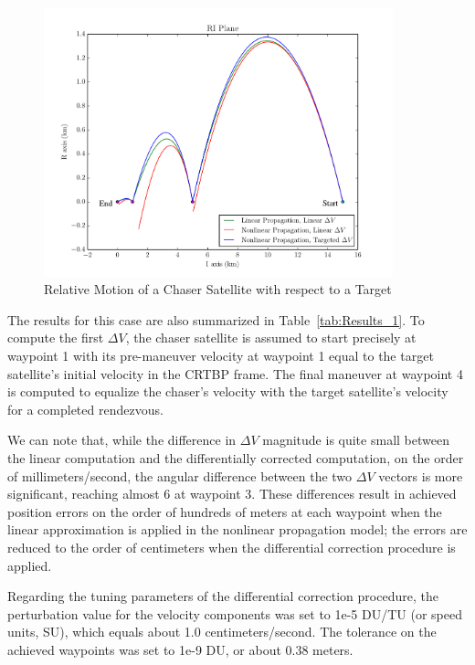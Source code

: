 \documentclass[letterpaper, preprint, paper,11pt]{AAS}	%
\begin{document}
\begin{figure}[htb] 
	\begin{center}
		\includegraphics[width=0.9\textwidth]{RIC_1}
		\caption{Relative Motion of a Chaser Satellite with respect to a Target}
		\label{fig:RIC_1}
	\end{center}
\end{figure} %

The results for this case are also summarized in Table~\ref{tab:Results_1}.  To compute the first \(\Delta V\), the chaser satellite is assumed to start precisely at waypoint 1 with its pre-maneuver velocity at waypoint 1 equal to the target satellite's initial velocity in the CRTBP frame.  The final maneuver at waypoint 4 is computed to equalize the chaser's velocity with the target satellite's velocity for a completed rendezvous.

We can note that, while the difference in \(\Delta V\) magnitude is quite small between the linear computation and the differentially corrected computation, on the order of millimeters/second, the angular difference between the two \(\Delta V\) vectors is more significant, reaching almost 6\textdegree \- at waypoint 3.  These differences result in achieved position errors on the order of hundreds of meters at each waypoint when the linear approximation is applied in the nonlinear propagation model; the errors are reduced to the order of centimeters when the differential correction procedure is applied.

Regarding the tuning parameters of the differential correction procedure, the perturbation value for the velocity components was set to 1e-5 DU/TU (or speed units, SU), which equals about 1.0 centimeters/second.  The tolerance on the achieved waypoints was set to 1e-9 DU, or about 0.38 meters.  
\end{document}
